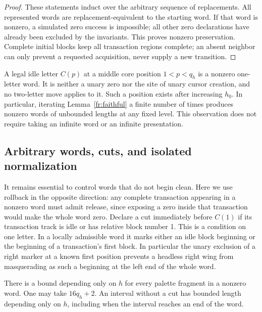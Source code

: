 \begin{proof}
These statements induct over the arbitrary sequence of
replacements.  All represented words are replacement-equivalent
to the starting word.  If that word is nonzero, a simulated zero
success is impossible; all other zero declarations have already
been excluded by the invariants.  This proves nonzero
preservation.  Complete initial blocks keep all transaction
regions complete; an absent neighbor can only prevent a requested
acquisition, never supply a new transition.
\end{proof}

A legal idle letter $C(p)$ at a middle core position $1<p<q_h$
is a nonzero one-letter word.  It is neither a unary zero nor the
site of unary cursor creation, and no two-letter move applies to
it.  Such a position exists after increasing $h_0$.  In particular,
iterating Lemma~\ref{fr:faithful} a finite number of times produces
nonzero words of unbounded lengths at any fixed level.  This
observation does not require taking an infinite word or an infinite
presentation.

\subsection{Arbitrary words, cuts, and isolated normalization}
\label{fr:tokens}

It remains essential to control words that do not begin clean. Here
we use rollback in the opposite direction: any complete transaction
appearing in a nonzero word must admit release, since exposing a zero
inside that transaction would make the whole word zero.
Declare a cut immediately before $C(1)$ if its transaction track
is idle or has relative block number 1.  This is a condition on
one letter.  In a locally admissible word it marks either an idle
block beginning or the beginning of a transaction's first block.
In particular the unary exclusion of a right marker at a known
first position prevents a headless right wing from masquerading
as such a beginning at the left end of the whole word.

\begin{lemma}\label{fr:fragment-bound}
There is a bound depending only on $h$ for every palette fragment
in a nonzero word.  One may take $16q_h+2$.  An interval without a
cut has bounded length depending only on $h$, including when the
interval reaches an end of the word.
\end{lemma}

